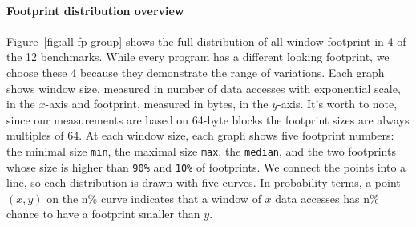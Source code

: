 \paragraph{Footprint distribution overview} Figure~\ref{fig:all-fp-group} shows the full distribution of
all-window footprint in 4 of the 12 benchmarks.  While
every program has a different looking footprint, we choose these 4
because they demonstrate the range of variations.  Each graph shows
window size, measured in number of data accesses with exponential scale,
in the $x$-axis and footprint, measured in bytes, in the $y$-axis.
It's worth to note, since our measurements are based on 64-byte blocks 
the footprint sizes are always multiples of 64.   At each window size,
each graph shows five footprint numbers: the minimal size {\tt min}, the
maximal size {\tt max}, the {\tt median}, and the two footprints whose
size is higher than {\tt 90\%} and {\tt 10\%} of footprints.  We
connect the points into a line, so each distribution is drawn with
five curves.  In probability terms, a point $(x, y)$ on the n\% curve
indicates that a window of $x$ data accesses has n\% chance to have a
footprint smaller than $y$.

\newlength{\figwid}
\setlength{\figwid}{0.46\textwidth}


